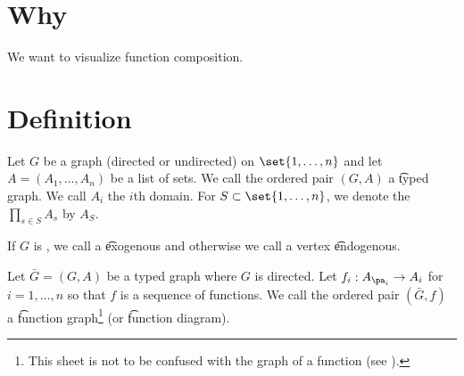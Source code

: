 
\section*{Why}

We want to visualize function composition.

\section*{Definition}

Let $G$ be a graph (directed or undirected) on $\set{1, \dots , n}$ and let $A = (A_1, \dots , A_n)$ be a list of sets.
We call the ordered pair $(G, A)$ a \t{typed graph}.
We call $A_i$ the \t{$i$th domain}.
For $S \subset \set{1, \dots , n}$, we denote the $\prod_{s \in S} A_s$ by $A_S$.

If $G$ is , we call a \t{exogenous} and otherwise we call a vertex \t{endogenous}.

Let $\bar{G} = (G, A)$ be a typed graph where $G$ is directed.
Let $f_i: A_{\pa_{i}} \to A_i$ for $i = 1, \dots , n$ so that $f$ is a sequence of functions.
We call the ordered pair $(\bar{G}, f)$ a \t{function graph}\footnote{This sheet is not to be confused with the graph of a function (see ).}
(or \t{function diagram}).

\blankpage